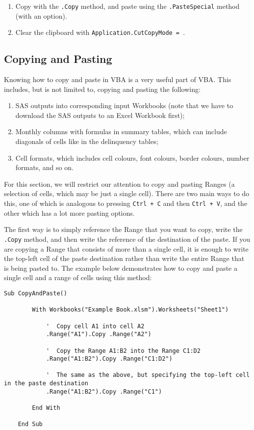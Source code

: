 \documentclass[11pt]{article}%
\begin{document}
\begin{enumerate}
    \item Copy with the \texttt{.Copy} method, and paste using the \texttt{.PasteSpecial} method (with an option).
    \item Clear the clipboard with \texttt{Application.CutCopyMode = }.
\end{enumerate}


\subsection{Copying and Pasting}

Knowing how to copy and paste in VBA is a very useful part of VBA. This includes, but is not limited to, copying and pasting the following:

\begin{enumerate}
    \item SAS outputs into corresponding input Workbooks (note that we have to download the SAS outputs to an Excel Workbook first);
    \item Monthly columns with formulas in summary tables, which can include diagonals of cells like in the delinquency tables;
    \item Cell formats, which includes cell colours, font colours, border colours, number formats, and so on.
\end{enumerate}

For this section, we will restrict our attention to copy and pasting Ranges (a selection of cells, which may be just a single cell). There are two main ways to do this, one of which is analogous to pressing \texttt{Ctrl + C} and then \texttt{Ctrl + V}, and the other which has a lot more pasting options.

The first way is to simply reference the Range that you want to copy, write the \texttt{.Copy} method, and then write the reference of the destination of the paste. If you are copying a Range that consists of more than a single cell, it is enough to write the top-left cell of the paste destination rather than write the entire Range that is being pasted to. The example below demonstrates how to copy and paste a single cell and a range of cells using this method:\\

\begin{lstlisting}[style=A]
    Sub CopyAndPaste()

        With Workbooks("Example Book.xlsm").Worksheets("Sheet1")

            '  Copy cell A1 into cell A2
            .Range("A1").Copy .Range("A2")

            '  Copy the Range A1:B2 into the Range C1:D2
            .Range("A1:B2").Copy .Range("C1:D2")

            '  The same as the above, but specifying the top-left cell in the paste destination
            .Range("A1:B2").Copy .Range("C1")

        End With

    End Sub
\end{lstlisting}
\end{document}
